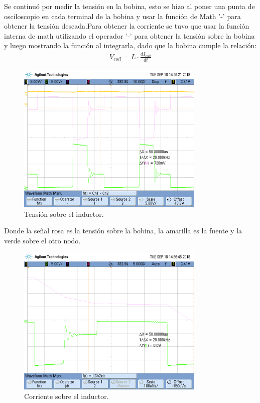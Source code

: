 Se continuó por medir la tensión en la bobina, esto se hizo al poner una punta de osciloscopio en cada terminal de la bobina y usar la función de Math '-' para obtener la tensión deseada.Para obtener la corriente se tuvo que usar la función interna de math utilizando el operador '-' para obtener la tensión sobre la bobina y luego mostrando la función al integrarla, dado que la bobina cumple la relación:
\begin{align} V_{coil} = L \cdot \frac{dI_{coil}}{dt}\end{align}
\begin{figure}[H]
	\centering
	\includegraphics[width=0.8\textwidth]{Imagenes/vcoil.png}
\caption{Tensión sobre el inductor.}
	\label{fig:vcoil}
\end{figure}
Donde la señal rosa es la tensión sobre la bobina, la amarilla es la fuente y la verde sobre el otro nodo.
\begin{figure}[H]
	\centering
	\includegraphics[width=0.8\textwidth]{Imagenes/icq_coil1.png}
\caption{Corriente sobre el inductor.}
	\label{fig:icoil}
\end{figure}
